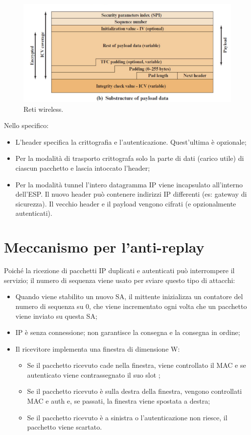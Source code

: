 \begin{figure}[h]
    \centering
    \includegraphics[width=1\textwidth]{images/chapter9/9-9.png}
    \caption{Reti wireless.}
    \label{fig:9-9}
\end{figure}

Nello specifico:
\begin{itemize}
    \item L'header specifica la crittografia e l'autenticazione. Quest'ultima è opzionale;
	\item Per la modalità di trasporto crittografa solo la parte di dati (carico utile) di ciascun pacchetto e lascia intoccato l'header;
	\item Per la modalità tunnel l'intero datagramma IP viene incapsulato all'interno dell'ESP. Il nuovo header può contenere indirizzi IP differenti (es: gateway di sicurezza). Il vecchio header e il payload vengono cifrati (e opzionalmente autenticati).
\end{itemize}

\section{Meccanismo per l'anti-replay}

Poiché la ricezione di pacchetti IP duplicati e autenticati può interrompere il servizio; il numero di sequenza viene usato per sviare questo tipo di attacchi:
\begin{itemize}
    \item Quando viene stabilito un nuovo SA, il mittente inizializza un contatore del numero di sequenza su 0, che viene incrementato ogni volta che un pacchetto viene inviato su questa SA;
	\item IP è senza connessione; non garantisce la consegna e la consegna in ordine;
	\item Il ricevitore implementa una finestra di dimensione W:
	\begin{itemize}
	    \item Se il pacchetto ricevuto cade nella finestra, viene controllato il MAC e se autenticato viene contrassegnato il suo slot ;
		\item Se il pacchetto ricevuto è sulla destra della finestra, vengono controllati MAC e auth e, se passati, la finestra viene spostata a destra;
		\item Se il pacchetto ricevuto è a sinistra o l'autenticazione non riesce, il pacchetto viene scartato.
	\end{itemize}
\end{itemize}

